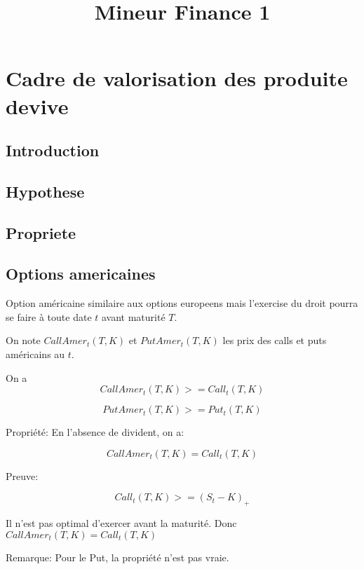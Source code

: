 \documentclass{article}
\title{Mineur Finance 1}
\begin{document}
\maketitle

\tableofcontents
\pagebreak

\section{Cadre de valorisation des produite devive}
\subsection{Introduction}
\subsection{Hypothese}
\subsection{Propriete}
\subsection{Options americaines}
Option am\'ericaine similaire aux options europeens mais l'exercise du droit pourra se faire \`a toute date $t$ avant maturit\'e $T$.

On note $CallAmer_t(T, K)$ et $PutAmer_t(T, K)$ les prix des calls et puts am\'ericains au $t$.

On a 
\begin{equation}
CallAmer_t(T,K) >= Call_t(T, K)
\end{equation}
 
\begin{equation}
PutAmer_t(T, K) >= Put_t(T, K)
\end{equation}

Propri\'et\'e:
En l'absence de divident, on a:

\begin{equation}
CallAmer_t(T, K) = Call_t(T, K)
\end{equation}

Preuve:

\begin{equation}
Call_t(T, K) >= (S_t- K)_+
\end{equation}

Il n'est pas optimal d'exercer avant la maturit\'e. Donc $CallAmer_t(T, K) = Call_t(T, K)$

Remarque: Pour le Put, la propri\'et\'e n'est pas vraie.
\end{document}
